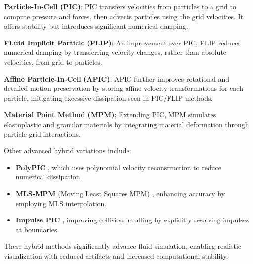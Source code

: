 \textbf{Particle-In-Cell (PIC)}: PIC \cite{Harlow1964PIC} transfers velocities from particles to a grid to compute pressure and forces, then advects particles using the grid velocities. It offers stability but introduces significant numerical damping.

\textbf{FLuid Implicit Particle (FLIP)}: An improvement over PIC, FLIP \cite{Brackbill1986FLIP} reduces numerical damping by transferring velocity changes, rather than absolute velocities, from grid to particles.

\textbf{Affine Particle-In-Cell (APIC)}: APIC \cite{Jiang2015APIC} further improves rotational and detailed motion preservation by storing affine velocity transformations for each particle, mitigating excessive dissipation seen in PIC/FLIP methods.

\textbf{Material Point Method (MPM)}: Extending PIC, MPM \cite{Sulsky1995MPM} simulates elastoplastic and granular materials by integrating material deformation through particle-grid interactions. 

Other advanced hybrid variations include:
\begin{itemize}
\item \textbf{PolyPIC} \cite{Fu2017PolyPIC}, which uses polynomial velocity reconstruction to reduce numerical dissipation.
\item \textbf{MLS-MPM} (Moving Least Squares MPM) \cite{Hu2018MLSMPM}, enhancing accuracy by employing MLS interpolation.
\item \textbf{Impulse PIC} \cite{Jiang2021ImpulsePIC}, improving collision handling by explicitly resolving impulses at boundaries.
\end{itemize}
These hybrid methods significantly advance fluid simulation, enabling realistic visualization with reduced artifacts and increased computational stability.